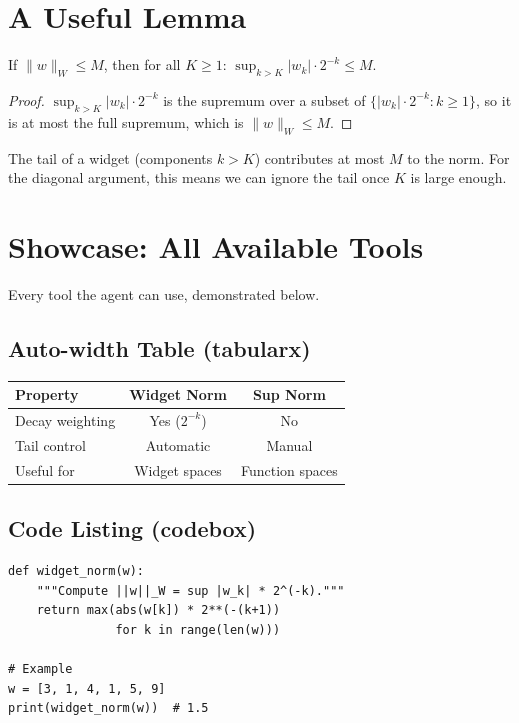 \documentclass[10pt, a4paper]{article}
\theoremstyle{definition}
\theoremstyle{remark}
\begin{document}
\section{A Useful Lemma}

\begin{thmbox}
If $\|w\|_W \le M$, then for all $K \ge 1$:
$\sup_{k > K} |w_k| \cdot 2^{-k} \le M$.
\end{thmbox}

\begin{proof}
$\sup_{k > K} |w_k| \cdot 2^{-k}$ is the supremum over a subset of
$\{|w_k| \cdot 2^{-k} : k \ge 1\}$, so it is at most the full
supremum, which is $\|w\|_W \le M$.
\end{proof}

\begin{whybox}[Intuition]
The tail of a widget (components $k > K$) contributes at most $M$ to
the norm. For the diagonal argument, this means we can ignore the tail
once $K$ is large enough.
\end{whybox}


\section{Showcase: All Available Tools}

Every tool the agent can use, demonstrated below.

\subsection{Auto-width Table (tabularx)}

\begin{center}
\begin{tabularx}{\textwidth}{X c c}
\toprule
\textbf{Property} & \textbf{Widget Norm} & \textbf{Sup Norm} \\
\midrule
Decay weighting & Yes ($2^{-k}$) & No \\
Tail control & Automatic & Manual \\
Useful for & Widget spaces & Function spaces \\
\bottomrule
\end{tabularx}
\end{center}

\subsection{Code Listing (codebox)}

\begin{codebox}
\begin{verbatim}
def widget_norm(w):
    """Compute ||w||_W = sup |w_k| * 2^(-k)."""
    return max(abs(w[k]) * 2**(-(k+1))
               for k in range(len(w)))

# Example
w = [3, 1, 4, 1, 5, 9]
print(widget_norm(w))  # 1.5
\end{verbatim}
\end{codebox}
\end{document}
